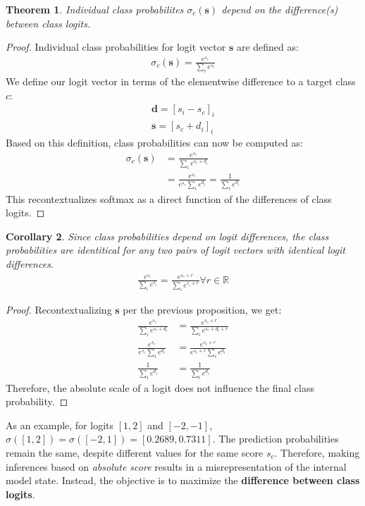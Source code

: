 \documentclass{article}
\theoremstyle{plain}
\newtheorem{theorem}{Theorem}[section]
\newtheorem{corollary}[theorem]{Corollary}
\theoremstyle{definition}
\theoremstyle{remark}
\begin{document}
\begin{theorem}\label{classprobdiff}
	Individual class probabilites $\sigma_c(\bm{s})$ depend on the difference(s) between class logits.
\end{theorem}
\begin{proof} Individual class probabilities for logit vector $\bm{s}$ are defined as:
	\begin{gather}
		\sigma_c(\bm{s}) = \frac{e^{s_c}}{\sum_i e^{s_i}}
	\end{gather}
	We define our logit vector in terms of the elementwise difference to a target class $c$:
	\begin{gather}
		\bm{d} = [s_i - s_c]_i \\
		\bm{s} = [s_c + d_i]_i
	\end{gather}
	Based on this definition, class probabilities can now be computed as:
	\begin{align}
		\sigma_c(\bm{s}) &= \frac{e^{s_c}}{\sum_i e^{s_c+d_i}} \\
				 &= \frac{e^{s_c}}{e^{s_c} \sum_i e^{d_i}} = \frac{1}{\sum_i e^{d_i}}
	\end{align}
	This recontextualizes softmax as a direct function of the differences of class logits.
\end{proof}
\begin{corollary} Since class probabilities depend on logit differences, the class probabilities are identitical for any two pairs of logit vectors with identical logit differences.
	\begin{gather}
		\frac{e^{s_c}}{\sum_i e^{s_i}} = \frac{e^{s_c+r}}{\sum_i e^{s_i+r}} \forall r \in \mathbb{R}
	\end{gather}
\end{corollary}
\begin{proof} Recontextualizing $\bm{s}$ per the previous proposition, we get:
	\begin{align}
		\frac{e^{s_c}}{\sum_i e^{s_c + d_i}} &= \frac{e^{s_c+r}}{\sum_i e^{s_c+d_i+r}} \\
		\frac{e^{s_c}}{e^{s_c}\sum_i e^{d_i}} &= \frac{e^{s_c+r}}{e^{s_c + r} \sum_i e^{d_i}} \\
		\frac{1}{\sum_i e^{d_i}} &= \frac{1}{\sum_i e^{d_i}}
	\end{align}
	Therefore, the absolute scale of a logit does not influence the final class probability.
\end{proof}

As an example, for logits $[1,2]$ and $[-2,-1]$, $\sigma([1,2]) = \sigma([-2,1]) = [0.2689, 0.7311]$. The prediction probabilities remain the same, despite different values for the same score $s_c$. Therefore, making inferences based on \textit{absolute score} results in a misrepresentation of the internal model state. Instead, the objective is to maximize the \textbf{difference between class logits}.
\end{document}
